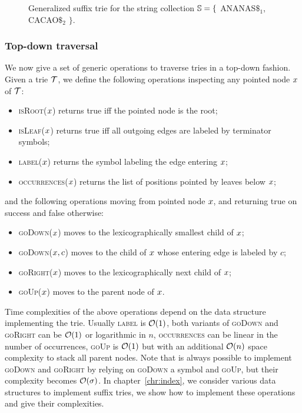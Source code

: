 \begin{figure}[h]
\caption[Example of generalized suffix trie]{Generalized suffix trie for the string collection $\mathbb {S} = \{$ {\ttfamily ANANAS$\$_1$}, {\ttfamily CACAO$\$_2$} $\}$.}
\label{fig:gstrie}
\begin{center}

\end{center}
\end{figure}

\subsubsection{Top-down traversal}

We now give a set of generic operations to traverse tries in a top-down fashion.
Given a trie $\mathcal {T}$, we define the following operations inspecting any pointed node $x$ of $\mathcal {T}$:
\begin{itemize}
\item \textsc{isRoot}($x$) returns true iff the pointed node is the root;
\item \textsc{isLeaf}($x$) returns true iff all outgoing edges are labeled by terminator symbols;
\item \textsc{label}($x$) returns the symbol labeling the edge entering $x$;
\item \textsc{occurrences}($x$) returns the list of positions pointed by leaves below $x$;
\end{itemize}
and the following operations moving from pointed node $x$, and returning true on success and false otherwise:
\begin{itemize}
\item \textsc{goDown}($x$) moves to the lexicographically smallest child of $x$;
\item \textsc{goDown}($x, c$) moves to the child of $x$ whose entering edge is labeled by $c$;
\item \textsc{goRight}($x$) moves to the lexicographically next child of $x$;
\item \textsc{goUp}($x$) moves to the parent node of $x$.
\end{itemize}

Time complexities of the above operations depend on the data structure implementing the trie.
Usually \textsc{label} is $\mathcal{O}(1)$, both variants of \textsc{goDown} and \textsc{goRight} can be $\mathcal{O}(1)$ or logarithmic in $n$, \textsc{occurrences} can be linear in the number of occurrences, \textsc{goUp} is $\mathcal{O}(1)$ but with an additional $\mathcal{O}(n)$ space complexity to stack all parent nodes.
Note that is always possible to implement \textsc{goDown} and \textsc{goRight} by relying on \textsc{goDown} a symbol and \textsc{goUp}, but their complexity becomes $\mathcal{O}(\sigma)$.
In chapter~\ref{chr:index}, we consider various data structures to implement suffix tries, we show how to implement these operations and give their complexities.

